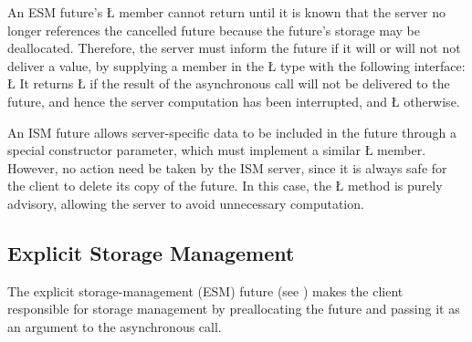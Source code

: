 \documentclass[openright,twoside]{report}
\begin{document}
An ESM future's \LGinlinetrue\LGbegin\lgrinde\L{}\endlgrinde\LGend{} member cannot return until it is known that the server no longer references the cancelled future because the future's storage may be deallocated.
Therefore, the server must inform the future if it will or will not not deliver a value, by supplying a member in the \LGinlinetrue\LGbegin\lgrinde\L{}\endlgrinde\LGend{} type with the following interface:
\LGinlinefalse\LGbegin\lgrinde
\L{}
\endlgrinde\LGend
It returns \LGinlinetrue\LGbegin\lgrinde\L{}\endlgrinde\LGend{} if the result of the asynchronous call will not be delivered to the future, and hence the server computation has been interrupted, and \LGinlinetrue\LGbegin\lgrinde\L{}\endlgrinde\LGend{} otherwise.

An ISM future allows server-specific data to be included in the future through a special constructor parameter, which must implement a similar \LGinlinetrue\LGbegin\lgrinde\L{}\endlgrinde\LGend{} member.
However, no action need be taken by the ISM server, since it is always safe for the client to delete its copy of the future.
In this case, the \LGinlinetrue\LGbegin\lgrinde\L{}\endlgrinde\LGend{} method is purely advisory, allowing the server to avoid unnecessary computation.


\subsection{Explicit Storage Management}

The explicit storage-management (ESM) future (see ) makes the client responsible for storage management by preallocating the future and passing it as an argument to the asynchronous call.
\end{document}
